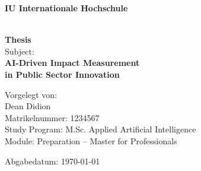 \documentclass[12pt]{report}
\begin{document}
\thispagestyle{empty}

\begin{titlepage}
    \centering
    \vspace*{1cm}

    {\LARGE\bfseries IU Internationale Hochschule}\\[0.3cm]
    \\


    \vfill

    {\Huge\bfseries Thesis}\\[0.5cm]
    {\Large Subject:}\\[0.2cm]
    {\LARGE\bfseries AI-Driven Impact Measurement\\ in Public Sector Innovation}

    \vfill

    Vorgelegt von:\\[0.2cm]
    {\Large Dean Didion}\\
    Matrikelnummer: 1234567\\[0.5cm]

    Study Program: M.Sc. Applied Artificial Intelligence\\
    Module: Preparation – Master for Professionals\\

    \vfill

    Abgabedatum: \today\\

    \vspace*{1cm}
\end{titlepage}



\tableofcontents
\listoffigures

\newpage















\nocite{*}
\printbibliography

\clearpage

\appendix




\end{document}
